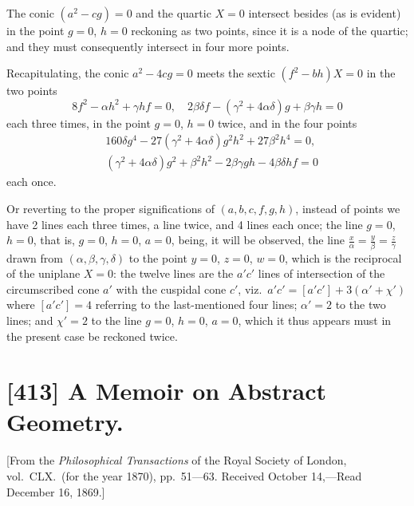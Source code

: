 \documentclass[11pt,a4paper]{article}
\theoremstyle{definition}
\begin{document}
The conic $(a^2-cg)=0$ and the quartic $X=0$ intersect besides (as is evident) in the point $g=0$, $h=0$ reckoning as two points, since it is a node of the quartic; and they must consequently intersect in four more points.

\setcounter{page}{456}

Recapitulating, the conic $a^2-4cg=0$ meets the sextic $(f^2-bh)X=0$ in the two points
\[
8f^2-\alpha h^2+\gamma hf=0, \quad 2\beta\delta f-(\gamma^2+4\alpha\delta)g+\beta\gamma h=0
\]
each three times, in the point $g=0$, $h=0$ twice, and in the four points
\begin{align*}
&160\delta g^4-27(\gamma^2+4\alpha\delta)g^2h^2+27\beta^2h^4=0,\\
&(\gamma^2+4\alpha\delta)g^2+\beta^2h^2-2\beta\gamma gh-4\beta\delta hf=0
\end{align*}
each once.

Or reverting to the proper significations of $(a,b,c,f,g,h)$, instead of points we have 2 lines each three times, a line twice, and 4 lines each once; the line $g=0$, $h=0$, that is, $g=0$, $h=0$, $a=0$, being, it will be observed, the line $\frac{x}{\alpha}=\frac{y}{\beta}=\frac{z}{\gamma}$ drawn from $(\alpha,\beta,\gamma,\delta)$ to the point $y=0$, $z=0$, $w=0$, which is the reciprocal of the uniplane $X=0$: the twelve lines are the $a'c'$ lines of intersection of the circumscribed cone $a'$ with the cuspidal cone $c'$, viz.\ $a'c'=[a'c']+3(\alpha'+\chi')$ where $[a'c']=4$ referring to the last-mentioned four lines; $\alpha'=2$ to the two lines; and $\chi'=2$ to the line $g=0$, $h=0$, $a=0$, which it thus appears must in the present case be reckoned twice.



\newpage
\section*{[413] A Memoir on Abstract Geometry.}

\begin{flushright}
\small[From the \textit{Philosophical Transactions} of the Royal Society of London, vol.~CLX.\ (for the year 1870), pp.~51---63. Received October 14,---Read December 16, 1869.]
\end{flushright}
\end{document}
